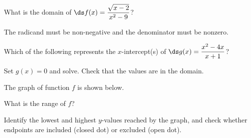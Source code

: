 \documentclass{ximera}
\begin{document}
\begin{problem}
What is the domain of $\ds f(x) = \dfrac{\sqrt{x-2}}{x^2-9}$?
\begin{hint}
The radicand must be non-negative and the denominator must be nonzero.
\end{hint}
\begin{multipleChoice}
  \choice[correct]{$[2,3) \cup (3,\infty)$}
  \choice{$[2,\infty)$}
\end{multipleChoice}
\end{problem}

\begin{problem}
Which of the following represents the $x$-intercept(s) of $\ds g(x) = \dfrac{x^2-4x}{x+1}$?
\begin{hint}
Set $g(x) = 0$ and solve. Check that the values are in the domain.
\end{hint}
\begin{multipleChoice}
\end{multipleChoice}
\end{problem}

\begin{problem}
The graph of function $f$ is shown below.

\begin{center}
\end{center}

What is the range of $f$?
\begin{hint}
Identify the lowest and highest $y$-values reached by the graph, and check whether endpoints are included (closed dot) or excluded (open dot).
\end{hint}
\begin{multipleChoice}
  \choice{$[-1,4]$}
  \choice[correct]{$[-1,4)$}
  \choice{$[-1,2) \cup (2,4)$}
  \choice{$(-1,4]$}
\end{multipleChoice}
\end{problem}
\end{document}
